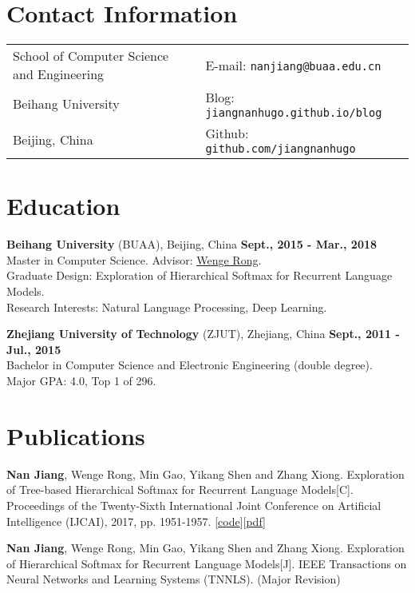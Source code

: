 \documentclass[margin,line]{resume}
\begin{document}

\begin{resume}
\section{Contact Information}
\begin{tabular}{@{}p{3.5in}p{3.5in}}
School of Computer Science and Engineering & { E-mail:}  {\tt nanjiang@buaa.edu.cn} \\
Beihang University                         & { Blog:} {\tt jiangnanhugo.github.io/blog} \\
Beijing, China                             & { Github:} {\tt github.com/jiangnanhugo} \\
\end{tabular}


\section{Education}
{\bf Beihang University} (BUAA), Beijing, China \hfill {\bf Sept., 2015 - Mar., 2018}\\
Master in Computer Science. Advisor: \underline{\href{http://dblp.uni-trier.de/pers/hd/r/Rong:Wenge}{Wenge Rong}}.\\
Graduate Design: Exploration of Hierarchical Softmax for Recurrent Language Models. \\
Research Interests: Natural Language Processing, Deep Learning. 

{\bf Zhejiang University of Technology} (ZJUT), Zhejiang, China \hfill {\bf Sept., 2011 - Jul., 2015}\\
Bachelor in Computer Science and Electronic Engineering (double degree). \\
\space Major GPA: 4.0, Top 1 of 296. 


\section{Publications}
\textbf{Nan Jiang}, Wenge Rong, Min Gao, Yikang Shen and Zhang Xiong. Exploration of Tree-based Hierarchical Softmax for Recurrent Language Models[C]. Proceedings of the Twenty-Sixth International Joint Conference on Artificial Intelligence (IJCAI), 2017, pp. 1951-1957. [\href{https://github.com/jiangnanHugo/lmkit}{code}][\href{https://www.ijcai.org/proceedings/2017/0271.pdf}{pdf}]

\textbf{Nan Jiang}, Wenge Rong, Min Gao, Yikang Shen and Zhang Xiong. Exploration of Hierarchical Softmax for Recurrent Language Models[J]. IEEE Transactions on Neural Networks and Learning Systems (TNNLS). (Major Revision)


\end{resume}
\end{document}
